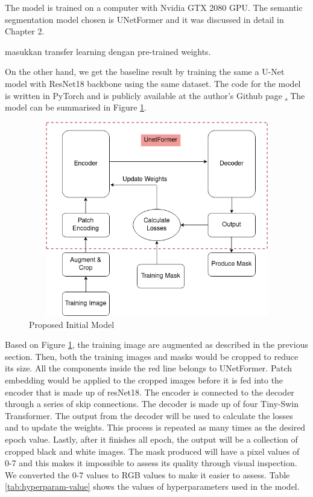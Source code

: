 The model is trained on a computer with Nvidia GTX 2080 GPU. The semantic segmentation model chosen is UNetFormer \cite{unetformer} and it was discussed in detail in Chapter 2.

masukkan transfer learning dengan pre-trained weights.

On the other hand, we get the baseline result by training the same a U-Net model with ResNet18 backbone using the same dataset. The code for the model is written in PyTorch and is publicly available at the author's Github page \href{https://github.com/WangLibo1995/GeoSeg}. The model can be summarised in Figure \ref{fig:initial-model}.

\begin{figure}[!h]
\includegraphics[width=13.0cm, height=8.5cm]{images/initial model.png}
\caption{Proposed Initial Model}
\label{fig:initial-model}
\end{figure}

Based on Figure \ref{fig:initial-model}, the training image are augmented as described in the previous section. Then, both the training images and masks would be cropped to reduce its size. All the components inside the red line belongs to UNetFormer. Patch embedding would be applied to the cropped images before it is fed into the encoder that is made up of resNet18. The encoder is connected to the decoder through a series of skip connections. The decoder is made up of four Tiny-Swin Transformer. The output from the decoder will be used to calculate the losses and to update the weights. This process is repeated as many times as the desired epoch value. Lastly, after it finishes all epoch, the output will be a collection of cropped black and white images. The mask produced will have a pixel values of 0-7 and this makes it impossible to assess its quality through visual inspection. We converted the 0-7 values to RGB values to make it easier to assess. Table \ref{tab:hyperparam-value} shows the values of hyperparameters used in the model.

